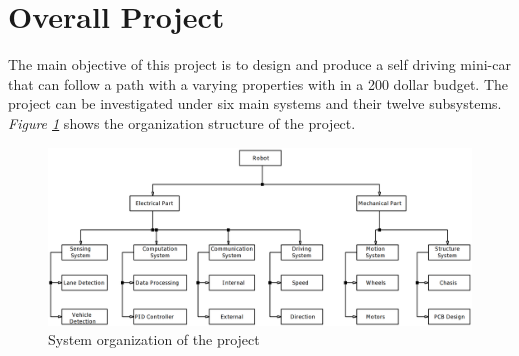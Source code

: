 \documentclass[a4paper,12pt]{article}
\begin{document}
	
		\section{Overall Project}
	
	The main objective of this project is to design and produce a self driving mini-car that can follow a path with a varying properties with in a 200 dollar budget. The project can be investigated under six main systems and their twelve subsystems. \textit{Figure \ref{fig:organization}} shows the organization structure of the project.
	\begin{figure}[h]
		\includegraphics[width=\textwidth,center]{images/organization.png}
		\caption{System organization of the project}\label{fig:organization}
	\end{figure}
	
\end{document}
